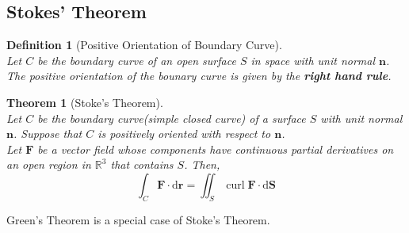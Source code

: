 \documentclass[12pt]{article}
\newtheorem{definition}{Definition}[section]
\newtheorem{theorem}{Theorem}[section]
\theoremstyle{definition}
\newcommand{\diff}{\mathrm{d}}
\DeclareMathOperator{\curl}{curl}
\begin{document}
\subsection{Stokes' Theorem}
\begin{definition}[Positive Orientation of Boundary Curve]
\hfill\\\normalfont Let $C$ be the boundary curve of an open surface $S$ in space with unit normal $\mathbf{n}$. The positive orientation of the bounary curve is given by the \textbf{right hand rule}.
\end{definition}
\begin{theorem}[Stoke's Theorem]
\hfill\\\normalfont Let $C$ be the boundary curve(simple closed curve) of a surface $S$ with unit normal $\mathbf{n}$. Suppose that $C$ is positively oriented with respect to $\mathbf{n}$.\\Let $\mathbf{F}$ be a vector field whose components have continuous partial derivatives on an open region in $\mathbb{R}^3$ that contains $S$. Then,
\[
\int_C\mathbf{F}\cdot\diff\mathbf{r}=\iint_S\curl\mathbf{F}\cdot\diff\mathbf{S}
\]
\end{theorem}
Green's Theorem is a special case of Stoke's Theorem.
\end{document}
